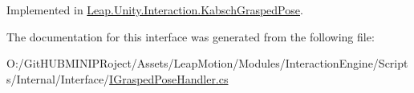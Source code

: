 Implemented in \mbox{\hyperlink{class_leap_1_1_unity_1_1_interaction_1_1_kabsch_grasped_pose_a661d3ea1067114b90addbc885691c899}{Leap.\+Unity.\+Interaction.\+Kabsch\+Grasped\+Pose}}.



The documentation for this interface was generated from the following file\+:\begin{DoxyCompactItemize}
\item 
O\+:/\+Git\+H\+U\+B\+M\+I\+N\+I\+P\+Roject/\+Assets/\+Leap\+Motion/\+Modules/\+Interaction\+Engine/\+Scripts/\+Internal/\+Interface/\mbox{\hyperlink{_i_grasped_pose_handler_8cs}{I\+Grasped\+Pose\+Handler.\+cs}}\end{DoxyCompactItemize}
